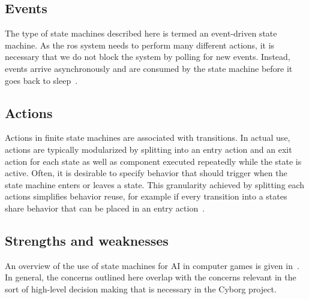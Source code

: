 \documentclass[\rootfolder/main.tex]{subfiles}
\begin{document}

\subsection{Events}

The type of state machines described here is termed an event-driven state machine.
As the \acrshort{ros} system needs to perform many different actions, it is necessary that we do not block the system by polling for new events.
Instead, events arrive asynchronously and are consumed by the state machine before it goes back to sleep~\cite{Millington2009}.


\subsection{Actions}

Actions in finite state machines are associated with transitions.
In actual use, actions are typically modularized by splitting into an entry action and an exit action for each state as well as component executed repeatedly while the state is active.
Often, it is desirable to specify behavior that should trigger when the state machine enters or leaves a state.
This granularity achieved by splitting each actions simplifies behavior reuse, for example if every transition into a states share behavior that can be placed in an entry action~\cite{Millington2009}.


\subsection{Strengths and weaknesses}
\label{sec:state_machine_strength_weaknesses}

An overview of the use of state machines for AI in computer games is given in~\cite{Millington2009}.
In general, the concerns outlined here overlap with the concerns relevant in the sort of high-level decision making that is necessary in the Cyborg project.
\end{document}
